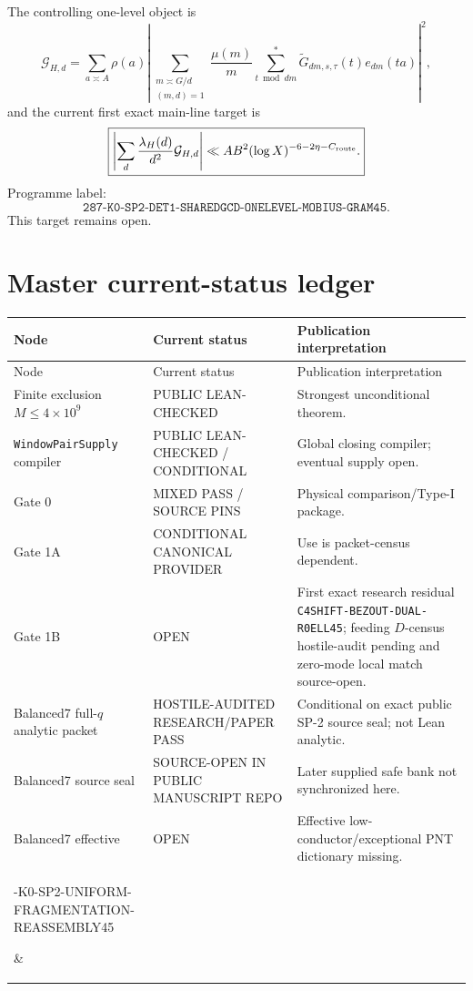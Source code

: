\documentclass[11pt]{article}
\theoremstyle{definition}
\newcommand{\1}{\mathbf 1}
\newcommand{\status}[1]{\textsf{#1}}
\begin{document}
The controlling one-level object is
\[
\mathcal G_{H,d}
=
\sum_{a\asymp A}\rho(a)
\left|
\sum_{\substack{m\asymp G/d\\(m,d)=1}}
\frac{\mu(m)}m
\sum_{t\bmod dm}^{*}
\widetilde G_{dm,s,\tau}(t)e_{dm}(ta)
\right|^2,
\]
and the current first exact main-line target is
\[
\boxed{
\left|
\sum_d\frac{\lambda_H(d)}{d^2}\mathcal G_{H,d}
\right|
\ll
AB^2(\log X)^{-6-2\eta-C_{\rm route}}.
}
\]
Programme label:
\[
\boxed{
\texttt{287-K0-SP2-DET1-SHAREDGCD-ONELEVEL-MOBIUS-GRAM45}.
}
\]
This target remains open.


\section{Master current-status ledger}
\label{sec:master-ledger}

{\footnotesize
\begin{longtable}{>{\raggedright\arraybackslash}p{}
>{\raggedright\arraybackslash}p{}
>{\raggedright\arraybackslash}p{}}
\toprule
Node & Current status & Publication interpretation\\
\midrule
\endfirsthead
\toprule
Node & Current status & Publication interpretation\\
\midrule
\endhead
Finite exclusion $M\le4\times10^9$ &
\status{PUBLIC LEAN-CHECKED} &
Strongest unconditional theorem.\\
\texttt{WindowPairSupply} compiler &
\status{PUBLIC LEAN-CHECKED / CONDITIONAL} &
Global closing compiler; eventual supply open.\\
Gate 0 &
\status{MIXED PASS / SOURCE PINS} &
Physical comparison/Type-I package.\\
Gate 1A &
\status{CONDITIONAL CANONICAL PROVIDER} &
Use is packet-census dependent.\\
Gate 1B &
\status{OPEN} &
First exact research residual \texttt{C4SHIFT-BEZOUT-DUAL-R0ELL45}; feeding $D$-census hostile-audit pending and zero-mode local match source-open.\\
Balanced7 full-$q$ analytic packet &
\status{HOSTILE-AUDITED RESEARCH/PAPER PASS} &
Conditional on exact public SP-2 source seal; not Lean analytic.\\
Balanced7 source seal &
\status{SOURCE-OPEN IN PUBLIC MANUSCRIPT REPO} &
Later supplied safe bank not synchronized here.\\
Balanced7 effective &
\status{OPEN} &
Effective low-conductor/exceptional PNT dictionary missing.\\
\parbox[t]{0.34\textwidth}{\raggedright{}-K0-SP2-UNIFORM-\\FRAGMENTATION-REASSEMBLY45} &

\end{longtable}}
\end{document}
